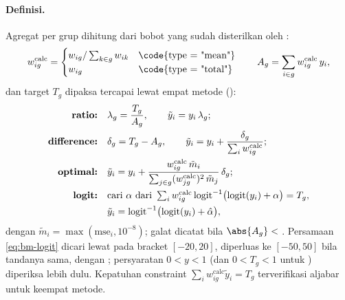 \paragraph{Definisi.} Agregat per grup dihitung dari bobot yang sudah
disterilkan oleh :
\begin{equation}
  w^{\text{calc}}_{ig}=
  \begin{cases}
    w_{ig}/\sum_{k\in g}w_{ik} & \text{\code{type = "mean"}}\\
    w_{ig} & \text{\code{type = "total"}}
  \end{cases}
  \qquad
  A_g=\sum_{i\in g}w^{\text{calc}}_{ig}\,y_i,
  \label{eq:bm-agg}
\end{equation}
dan target $T_g$ dipaksa tercapai lewat empat metode
():
\begin{align}
  \text{\textbf{ratio:}}\quad
    &\lambda_g=\frac{T_g}{A_g},\qquad \tilde y_i=y_i\,\lambda_g;
    \label{eq:bm-ratio}\\
  \text{\textbf{difference:}}\quad
    &\delta_g=T_g-A_g,\qquad
      \tilde y_i=y_i+\frac{\delta_g}{\sum_i w^{\text{calc}}_{ig}};
    \label{eq:bm-diff}\\
  \text{\textbf{optimal:}}\quad
    &\tilde y_i=y_i+\frac{w^{\text{calc}}_{ig}\,\tilde m_i}
      {\sum_{j\in g}(w^{\text{calc}}_{jg})^2\,\tilde m_j}\,\delta_g;
    \label{eq:bm-opt}\\
  \text{\textbf{logit:}}\quad
    &\text{cari }\alpha\text{ dari }\textstyle
      \sum_i w^{\text{calc}}_{ig}\,
      \mathrm{logit}^{-1}\bigl(\mathrm{logit}(y_i)+\alpha\bigr)=T_g,\notag\\
    &\tilde y_i=\mathrm{logit}^{-1}\bigl(\mathrm{logit}(y_i)+\hat\alpha\bigr),
    \label{eq:bm-logit}
\end{align}
dengan $\tilde m_i=\max(\mathrm{mse}_i,10^{-8})$; galat
 dicatat bila $\abs{A_g}<$ . Persamaan
\eqref{eq:bm-logit} dicari lewat  pada bracket
$[-20,20]$, diperluas ke $[-50,50]$ bila tandanya sama, dengan
; persyaratan $0<y<1$ (dan $0<T_g<1$ untuk
) diperiksa lebih dulu. Kepatuhan constraint
$\sum_i w^{\text{calc}}_{ig}\tilde y_i=T_g$ terverifikasi aljabar untuk
keempat metode.


